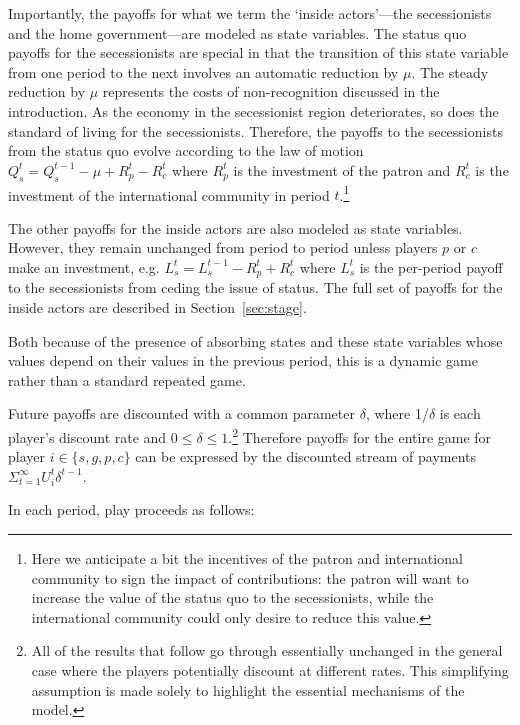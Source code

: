 \documentclass[11pt,letterpaper, notitlepage]{article}
\newcommand{\de}{\delta}
\begin{document}
Importantly, the payoffs for what we term the `inside actors'---the secessionists and the home government---are modeled as state variables. The status quo payoffs for the secessionists are special in that the transition of this state variable from one period to the next involves an automatic reduction by $\mu$. The steady reduction by $\mu$ represents the costs of non-recognition discussed in the introduction. As the economy in the secessionist region deteriorates, so does the standard of living for the secessionists. Therefore, the payoffs to the secessionists from the status quo evolve according to the law of motion $Q_s^{t} = Q_s^{t-1} - \mu + R_p^t - R_c^t$ where $R_p^t$ is the investment of the patron and $R_c^t$ is the investment of the international community in period $t$.\footnote{Here we anticipate a bit the incentives of the patron and international community to sign the impact of contributions: the patron will want to increase the value of the status quo to the secessionists, while the international community could only desire to reduce this value.}

The other payoffs for the inside actors are also modeled as state variables. However, they remain unchanged from period to period unless players $p$ or $c$ make an investment, e.g. $L_s^t = L_s^{t-1} - R_p^t + R_c^t$ where $L_s^t$ is the per-period payoff to the secessionists from ceding the issue of status. The full set of payoffs for the inside actors are described in Section~\ref{sec:stage}.

Both because of the presence of absorbing states and these state variables whose values depend on their values in the previous period, this is a dynamic game rather than a standard repeated game.

Future payoffs are discounted with a common parameter $\de$, where 1/$\de$ is each player's discount rate and $0\leq\de\leq1$.\footnote{All of the results that follow go through essentially unchanged in the general case where the players potentially discount at different rates. This simplifying assumption is made solely to highlight the essential mechanisms of the model.} Therefore payoffs for the entire game for player $i\in \{s, g, p, c\} $ can be expressed by the discounted stream of payments $\Sigma_{t=1}^{\infty} U_i^t \de^{t-1}$.

In each period, play proceeds as follows:
\end{document}
